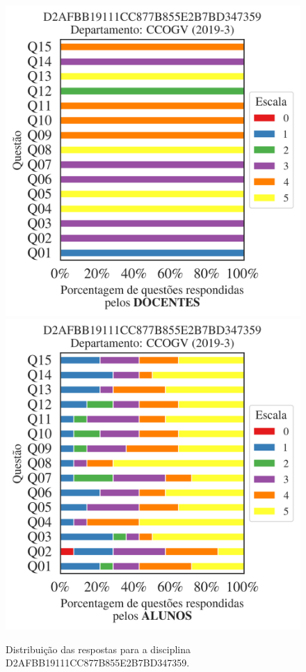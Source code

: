 \documentclass[a4paper,10pt]{article}
\begin{document}
\begin{figure}[h]
\centering
\includegraphics[width=0.485\linewidth]{analise_disciplina_departamento_CCOGV_D2AFBB19111CC877B855E2B7BD347359_docentes.png}
\includegraphics[width=0.485\linewidth]{analise_disciplina_departamento_CCOGV_D2AFBB19111CC877B855E2B7BD347359_alunos.png}
\caption{\label{fig:analise_geral_departamento}                Distribuição das respostas para a disciplina D2AFBB19111CC877B855E2B7BD347359. }
\end{figure}
\end{document}
